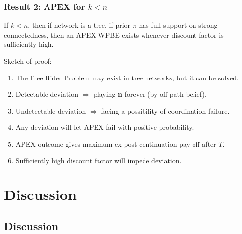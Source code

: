 \documentclass[8pt]{beamer}
\begin{document}
%
%
%
%
%
%

\begin{frame}
\frametitle{Result 2: APEX for $k<n$}
\begin{theorem}[\alert{$k< n$}]
If $k<n$, then if network is a \alert{tree}, if prior $\pi$ has \alert{full support on strong connectedness}, then an APEX WPBE {exists} whenever discount factor is sufficiently high.
\end{theorem}

Sketch of proof:
\begin{enumerate}
\item \underline{The Free Rider Problem may exist in tree networks, but it can be solved}.
\item Detectable deviation $\Rightarrow$ playing \textbf{n} forever (by off-path belief).
\item Undetectable deviation $\Rightarrow$ facing a possibility of coordination failure.
\item Any deviation will let APEX fail with positive probability.
\item APEX outcome gives maximum ex-post continuation pay-off after $T$.
\item Sufficiently high discount factor will impede deviation.
\end{enumerate}



\end{frame}


\section{Discussion}
\subsection{Discussion}
\end{document}
